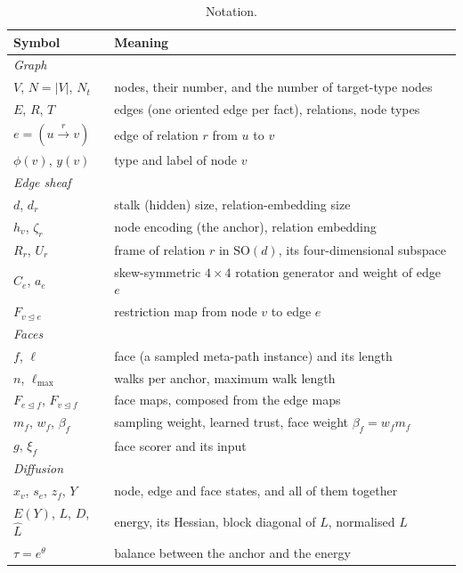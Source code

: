 \documentclass{article}
\newcommand{\inc}{\trianglelefteq}
\begin{document}
\begin{table}[!htbp]
  \centering
  \caption{Notation.}
  \label{tab:app-notation}
  \scriptsize
  \setlength{\tabcolsep}{3pt}
  \begin{tabular}{lp{}}
    \toprule
    Symbol & Meaning \\
    \midrule
    \multicolumn{2}{l}{\emph{Graph}} \\
    $V$, $N=|V|$, $N_t$ & nodes, their number, and the number of target-type nodes \\
    $E$, $R$, $T$ & edges (one oriented edge per fact), relations, node types \\
    $e=(u\xrightarrow{r}v)$ & edge of relation $r$ from $u$ to $v$ \\
    $\phi(v)$, $y(v)$ & type and label of node $v$ \\
    \midrule
    \multicolumn{2}{l}{\emph{Edge sheaf}} \\
    $d$, $d_r$ & stalk (hidden) size, relation-embedding size \\
    $h_v$, $\zeta_r$ & node encoding (the anchor), relation embedding \\
    $R_r$, $U_r$ & frame of relation $r$ in $\mathrm{SO}(d)$, its four-dimensional subspace \\
    $C_e$, $a_e$ & skew-symmetric $4\times4$ rotation generator and weight of edge $e$ \\
    $F_{v\inc e}$ & restriction map from node $v$ to edge $e$ \\
    \midrule
    \multicolumn{2}{l}{\emph{Faces}} \\
    $f$, $\ell$ & face (a sampled meta-path instance) and its length \\
    $n$, $\ell_{\max}$ & walks per anchor, maximum walk length \\
    $F_{e\inc f}$, $F_{v\inc f}$ & face maps, composed from the edge maps \\
    $m_f$, $w_f$, $\beta_f$ & sampling weight, learned trust, face weight $\beta_f=w_fm_f$ \\
    $g$, $\xi_f$ & face scorer and its input \\
    \midrule
    \multicolumn{2}{l}{\emph{Diffusion}} \\
    $x_v$, $s_e$, $z_f$, $Y$ & node, edge and face states, and all of them together \\
    $E(Y)$, $L$, $D$, $\hat L$ & energy, its Hessian, block diagonal of $L$, normalised $L$ \\
    $\tau=e^{\theta}$ & balance between the anchor and the energy \\

\end{tabular}
\end{table}
\end{document}

